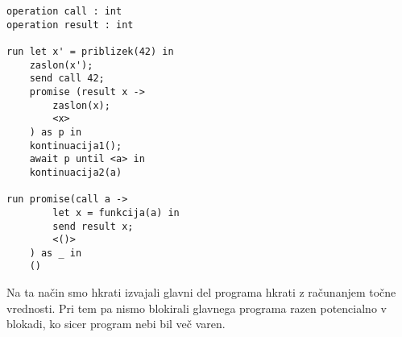\begin{lstlisting}[caption={Asinhron Vzporeden primer.},label={prog:primer-1},float,floatplacement=H]
operation call : int
operation result : int
 
run let x' = priblizek(42) in
    zaslon(x');
    send call 42;
    promise (result x ->
    	zaslon(x);
    	<x>
    ) as p in
    kontinuacija1();
    await p until <a> in
    kontinuacija2(a)

run promise(call a ->
    	let x = funkcija(a) in
    	send result x;
    	<()>
    ) as _ in
    ()
\end{lstlisting}

Na ta način smo hkrati izvajali glavni del programa hkrati z računanjem točne vrednosti. Pri tem pa nismo blokirali glavnega programa razen potencialno v blokadi, ko sicer program nebi bil več varen.